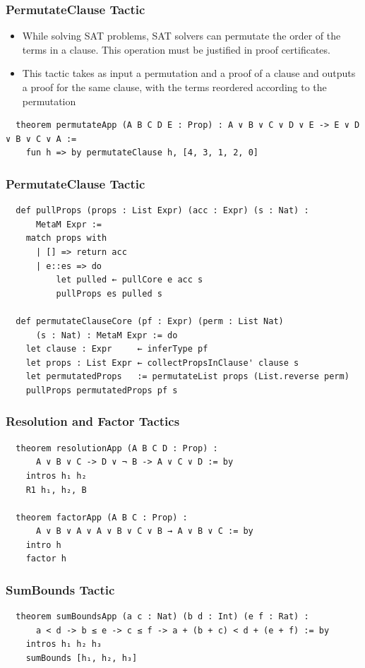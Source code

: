 \documentclass[usepdftitle=false,aspectratio=169,usenames,dvipsnames]{beamer}
\newcommand\vitem{\vfill\item}
\begin{document}
\begin{frame}[fragile]
  \frametitle{PermutateClause Tactic}
  \begin{itemize}
    \item While solving SAT problems, SAT solvers can permutate the order of the terms in a clause. This operation must be justified in proof certificates.
    \vitem This tactic takes as input a permutation and a proof of a clause and outputs a proof for the same clause, with the terms reordered according to the permutation
  \end{itemize}
  \vfill
  \begin{verbatim}
  theorem permutateApp (A B C D E : Prop) : A ∨ B ∨ C ∨ D ∨ E -> E ∨ D ∨ B ∨ C ∨ A :=
    fun h => by permutateClause h, [4, 3, 1, 2, 0]
  \end{verbatim}
\end{frame}

\begin{frame}[fragile]
  \frametitle{PermutateClause Tactic}
  \begin{verbatim}
  def pullProps (props : List Expr) (acc : Expr) (s : Nat) :
      MetaM Expr :=
    match props with
      | [] => return acc
      | e::es => do
          let pulled ← pullCore e acc s
          pullProps es pulled s

  def permutateClauseCore (pf : Expr) (perm : List Nat)
      (s : Nat) : MetaM Expr := do
    let clause : Expr     ← inferType pf
    let props : List Expr ← collectPropsInClause' clause s
    let permutatedProps   := permutateList props (List.reverse perm)
    pullProps permutatedProps pf s
  \end{verbatim}
\end{frame}

\begin{frame}[fragile]
  \frametitle{Resolution and Factor Tactics}
  \begin{verbatim}
  theorem resolutionApp (A B C D : Prop) :
      A ∨ B ∨ C -> D ∨ ¬ B -> A ∨ C ∨ D := by
    intros h₁ h₂
    R1 h₁, h₂, B

  theorem factorApp (A B C : Prop) :
      A ∨ B ∨ A ∨ A ∨ B ∨ C ∨ B → A ∨ B ∨ C := by
    intro h
    factor h
  \end{verbatim}
\end{frame}

\begin{frame}[fragile]
  \frametitle{SumBounds Tactic}
  \begin{verbatim}
  theorem sumBoundsApp (a c : Nat) (b d : Int) (e f : Rat) :
      a < d -> b ≤ e -> c ≤ f -> a + (b + c) < d + (e + f) := by
    intros h₁ h₂ h₃
    sumBounds [h₁, h₂, h₃]
  \end{verbatim}
\end{frame}
\end{document}
